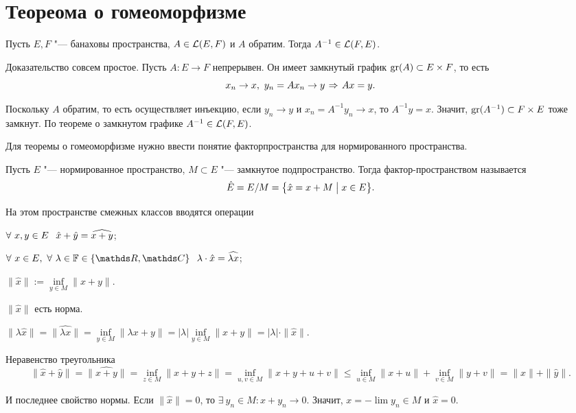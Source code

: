 \section{Теореома о гомеоморфизме}

\begin{The}\label{Banahobr}
  Пусть $E,F$ "--- банаховы пространства, $A\in \mathcal L(E,F)$ и $A$ обратим. Тогда $A^{-1}\in\mathcal L(F,E)$.
\end{The}
\begin{Proof}
Доказательство совсем простое. Пусть $A\colon E\to F$ непрерывен. Он имеет замкнутый график $\operatorname{gr}(A)\subset E\times F$, то есть
\[
  x_n\to x,\ y_n = A x_n\to y\imp Ax=y.
\]

Поскольку $A$ обратим, то есть осуществляет инъекцию, если $y_n\to y$ и $x_n = A^{-1}y_n\to x$, то $A^{-1}y=x$. Значит, $\operatorname{gr}(A^{-1})\subset F\times E$ тоже замкнут. По теореме о замкнутом графике $A^{-1}\in \mathcal L(F,E)$.
\end{Proof}

Для теоремы о гомеоморфизме нужно ввести понятие факторпространства для нормированного пространства.

\begin{Def}
Пусть $E$ "--- нормированное пространство, $M\subset E$ "--- замкнутое подпространство. Тогда фактор-пространством называется
\[
  \hat E = E/M = \big\{\hat x = x+ M\bigm|x\in E\big\}.
\]

На этом пространстве смежных классов вводятся операции
\begin{azItems}
\item $\forall\ x,y\in E\pau \hat x+ \hat y = \widehat{x+y}$;
\item $\forall\ x\in E,\ \forall\ \lambda\in\F\in\{\R,\C\}\pau \lambda\cdot \hat x = \widehat{\lambda x}$;
\item $\|\hat x\|:=\inf\limits_{y\in M}\|x+y\|$.
\end{azItems}
\end{Def}

\begin{Ut}
$\|\hat x\|$ есть норма.
\end{Ut}
\begin{Proof}
  $\|\lambda \hat x\| = \|\widehat{\lambda x}\| =\inf\limits_{y\in M}\|\lambda x+y\| = |\lambda|\inf\limits_{y\in M}\|x+y\| = |\lambda|\cdot\|\hat x\|$.

Неравенство треугольника
\[
  \|\hat x+\hat y\| = \|\widehat{x+y}\| = \inf\limits_{z\in M}\|x+y+z\| = \inf\limits_{u,v\in M}\|x+y+u+v\|\le
  \inf\limits_{u\in M}\|x+u\| + \inf\limits_{v\in M}\|y+v\| = \|\hat x\| + \|\hat y\|.
\]

И последнее свойство нормы. Если $\|\hat x\|=0$, то $\exists\ y_n\in M\colon x+y_n\to 0$. Значит, $x = -\lim y_n\in M$ и $\hat x=0$.
\end{Proof}

